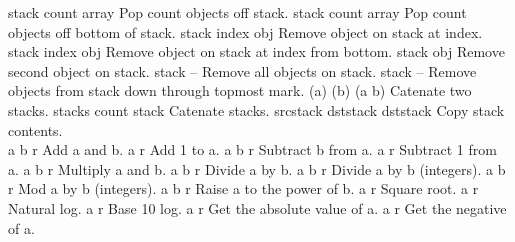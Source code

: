 \begin{longtable}{}
\hline
\optableent
	{stack count}
	{{\bf {}}}
	{array}
	{Pop count objects off stack.}
\hline
\optableent
	{stack count}
	{{\bf {}}}
	{array}
	{Pop count objects off bottom of stack.}
\hline
\optableent
	{stack index}
	{{\bf {}}}
	{obj}
	{Remove object on stack at index.}
\hline
\optableent
	{stack index}
	{{\bf {}}}
	{obj}
	{Remove object on stack at index from bottom.}
\hline
\optableent
	{stack}
	{{\bf {}}}
	{obj}
	{Remove second object on stack.}
\hline
\optableent
	{stack}
	{{\bf {}}}
	{--}
	{Remove all objects on stack.}
\hline
\optableent
	{stack}
	{{\bf {}}}
	{--}
	{Remove objects from stack down through topmost mark.}
\hline
\optableent
	{(a) (b)}
	{{\bf {}}}
	{(a b)}
	{Catenate two stacks.}
\hline
\optableent
	{stacks count}
	{{\bf {}}}
	{stack}
	{Catenate stacks.}
\hline
\optableent
	{srcstack dststack}
	{{\bf {}}}
	{dststack}
	{Copy stack contents.}
\hline \hline
{} \\
\hline \hline
\optableent
	{a b}
	{{\bf {}}}
	{r}
	{Add a and b.}
\hline
\optableent
	{a}
	{{\bf {}}}
	{r}
	{Add 1 to a.}
\hline
\optableent
	{a b}
	{{\bf {}}}
	{r}
	{Subtract b from a.}
\hline
\optableent
	{a}
	{{\bf {}}}
	{r}
	{Subtract 1 from a.}
\hline
\optableent
	{a b}
	{{\bf {}}}
	{r}
	{Multiply a and b.}
\hline
\optableent
	{a b}
	{{\bf {}}}
	{r}
	{Divide a by b.}
\hline
\optableent
	{a b}
	{{\bf {}}}
	{r}
	{Divide a by b (integers).}
\hline
\optableent
	{a b}
	{{\bf {}}}
	{r}
	{Mod a by b (integers).}
\hline
\optableent
	{a b}
	{{\bf {}}}
	{r}
	{Raise a to the power of b.}
\hline
\optableent
	{a}
	{{\bf {}}}
	{r}
	{Square root.}
\hline
\optableent
	{a}
	{{\bf {}}}
	{r}
	{Natural log.}
\hline
\optableent
	{a}
	{{\bf {}}}
	{r}
	{Base 10 log.}
\hline
\optableent
	{a}
	{{\bf {}}}
	{r}
	{Get the absolute value of a.}
\hline
\optableent
	{a}
	{{\bf {}}}
	{r}
	{Get the negative of a.}
\hline

\end{longtable}
